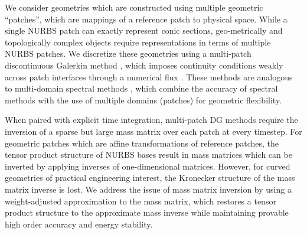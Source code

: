 \documentclass[preprint,10pt]{elsarticle}
\newcommand{\reviewerTwo}[1]{#1}
\begin{document}
We consider geometries which are constructed using multiple geometric ``patches'', which are mappings of a reference patch to physical space.  While a single NURBS patch can exactly represent conic sections, \reviewerTwo{geo-metrically} and topologically complex objects require representations in terms of multiple NURBS patches.  We discretize these geometries using a multi-patch discontinuous Galerkin method \cite{langer2015multipatch}, which imposes continuity conditions weakly across patch interfaces through a numerical flux \cite{nguyen2014nitsche}.  These methods are analogous to multi-domain spectral methods \cite{canuto2012spectral}, which combine the accuracy of spectral methods with the use of multiple domains (patches) for geometric flexibility.  %

When paired with explicit time integration, multi-patch DG methods require the inversion of a \reviewerTwo{sparse but large} mass matrix over each patch at every timestep.   
For geometric patches which are affine transformations of reference patches, the tensor product structure of NURBS bases result in mass matrices which can be inverted by applying inverses of one-dimensional matrices.  However, for curved geometries of practical engineering interest, the Kronecker structure of the mass matrix inverse is lost.  We address the issue of mass matrix inversion by using a weight-adjusted approximation to the mass matrix, which restores a tensor product structure to the approximate mass inverse while maintaining provable high order accuracy and energy stability.  %
\end{document}
